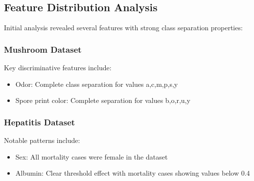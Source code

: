 \subsection{Feature Distribution Analysis}
Initial analysis revealed several features with strong class separation properties:

\subsubsection{Mushroom Dataset}
Key discriminative features include:
\begin{itemize}
	\item Odor: Complete class separation for values a,c,m,p,s,y
	\item Spore print color: Complete separation for values b,o,r,u,y
\end{itemize}

\subsubsection{Hepatitis Dataset}
Notable patterns include:
\begin{itemize}
	\item Sex: All mortality cases were female in the dataset
	\item Albumin: Clear threshold effect with mortality cases showing values below 0.4
\end{itemize}
